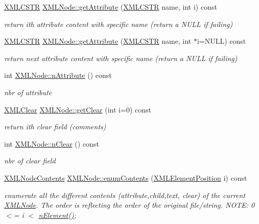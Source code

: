 \begin{DoxyCompactItemize}
\hyperlink{xmlParser_8h_acdb0d6fd8dd596384b438d86cfb2b182}{X\-M\-L\-C\-S\-T\-R} \hyperlink{group__navigate_gaba897c342d3c55d71f4d987332789f69}{X\-M\-L\-Node\-::get\-Attribute} (\hyperlink{xmlParser_8h_acdb0d6fd8dd596384b438d86cfb2b182}{X\-M\-L\-C\-S\-T\-R} name, int i) const 
\begin{DoxyCompactList}\small\item\em return ith attribute content with specific name (return a N\-U\-L\-L if failing) \end{DoxyCompactList}\item 
\hyperlink{xmlParser_8h_acdb0d6fd8dd596384b438d86cfb2b182}{X\-M\-L\-C\-S\-T\-R} \hyperlink{group__navigate_ga23af0b5c771a9a5e7503a7dd2de72fc8}{X\-M\-L\-Node\-::get\-Attribute} (\hyperlink{xmlParser_8h_acdb0d6fd8dd596384b438d86cfb2b182}{X\-M\-L\-C\-S\-T\-R} name, int $\ast$i=N\-U\-L\-L) const 
\begin{DoxyCompactList}\small\item\em return next attribute content with specific name (return a N\-U\-L\-L if failing) \end{DoxyCompactList}\item 
int \hyperlink{group__navigate_ga9561f62b9ed1fa653fe9135c4f16a41d}{X\-M\-L\-Node\-::n\-Attribute} () const 
\begin{DoxyCompactList}\small\item\em nbr of attribute \end{DoxyCompactList}\item 
\hyperlink{structXMLClear}{X\-M\-L\-Clear} \hyperlink{group__navigate_gab99fbcb5534ab2194889c4802e290354}{X\-M\-L\-Node\-::get\-Clear} (int i=0) const 
\begin{DoxyCompactList}\small\item\em return ith clear field (comments) \end{DoxyCompactList}\item 
int \hyperlink{group__navigate_ga87d34f1ba1ba7d49e8aeacc63548dead}{X\-M\-L\-Node\-::n\-Clear} () const 
\begin{DoxyCompactList}\small\item\em nbr of clear field \end{DoxyCompactList}\item 
\hyperlink{structXMLNodeContents}{X\-M\-L\-Node\-Contents} \hyperlink{group__navigate_gaf56414ef38a13892afc4f22177a7760a}{X\-M\-L\-Node\-::enum\-Contents} (\hyperlink{xmlParser_8h_aab10d65aadeca1f026f6416becde7432}{X\-M\-L\-Element\-Position} i) const 
\begin{DoxyCompactList}\small\item\em enumerate all the different contents (attribute,child,text, clear) of the current \hyperlink{structXMLNode}{X\-M\-L\-Node}. The order is reflecting the order of the original file/string. N\-O\-T\-E\-: 0 $<$= i $<$ \hyperlink{group__navigate_ga8e9538deb9144dcab39b3a510a8202f1}{n\-Element()}; \end{DoxyCompactList}\item 

\end{DoxyCompactItemize}
